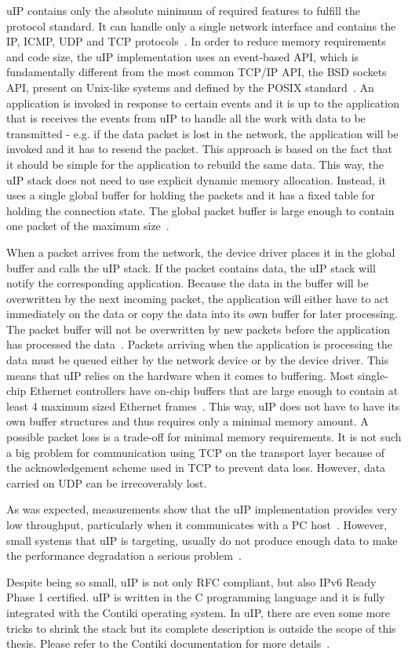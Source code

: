 uIP contains only the absolute minimum of required features to fulfill the protocol standard.
It can handle only a single network interface and contains the IP, ICMP, UDP and TCP protocols~\cite{contiki-docs}.
In order to reduce memory requirements and code size,
the uIP implementation uses an event-based API, which is fundamentally different
from the most common TCP/IP API, the BSD sockets API, present on Unix-like systems
and defined by the POSIX standard~\cite{thesis-programming,posix}.
An application is invoked in response to certain events and
it is up to the application that is receives the events from uIP to handle all the
work with data to be transmitted - e.g. if the data packet is lost in the network,
the application will be invoked and it has to resend the packet.
This approach is based on the fact that it should be simple for the application
to rebuild the same data.
This way, the uIP stack does not need to use explicit dynamic memory allocation.
Instead, it uses a single global buffer for holding the packets and it has a fixed
table for holding the connection state.
The global packet buffer is large enough to contain one packet of the maximum size~\cite{contiki-docs}. %

When a packet arrives from the network, the device driver places it in the
global buffer and calls the uIP stack.
If the packet contains data, the uIP stack will notify the corresponding application.
Because the data in the buffer will be overwritten by the next incoming packet,
the application will either have to act immediately on the data or copy the data into
its own buffer for later processing.
The packet buffer will not be overwritten by new packets before the application has processed the data~\cite{contiki-docs}.
Packets arriving when the application is processing the data must be queued
either by the network device or by the device driver.
This means that uIP relies on the hardware when it comes to buffering.
Most single-chip Ethernet controllers have on-chip buffers
that are large enough to contain at least 4 maximum sized Ethernet frames~\cite{contiki-docs}.
This way, uIP does not have to have its own buffer structures and thus requires only a minimal memory amount.
A possible packet loss is a trade-off for minimal memory requirements.
It is not such a big problem for communication using TCP on the transport layer
because of the acknowledgement scheme used in TCP to prevent data loss.
However, data carried on UDP can be irrecoverably lost.

As was expected, measurements show that the uIP implementation provides very low
throughput, particularly when it communicates with a PC host~\cite{thesis-towards}.
However, small systems that uIP is targeting, usually do not produce enough data
to make the performance degradation a serious problem~\cite{thesis-towards}.

Despite being so small, uIP is not only RFC compliant, but also IPv6 Ready Phase 1 certified.
uIP is written in the C programming language and it is fully integrated with the Contiki operating system.
In uIP, there are even some more tricks to shrink the stack
but its complete description is outside the scope of this thesis.
Please refer to the Contiki documentation for more details~\cite{contiki-docs}.
